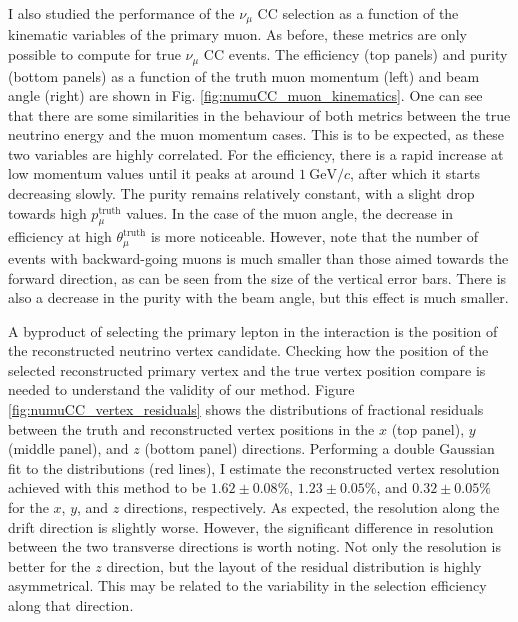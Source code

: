I also studied the performance of the $\nu_{\mu}$ CC selection as a function of the kinematic variables of the primary muon. As before, these metrics are only possible to compute for true $\nu_{\mu}$ CC events. The efficiency (top panels) and purity (bottom panels) as a function of the truth muon momentum (left) and beam angle (right) are shown in Fig. \ref{fig:numuCC_muon_kinematics}. One can see that there are some similarities in the behaviour of both metrics between the true neutrino energy and the muon momentum cases. This is to be expected, as these two variables are highly correlated. For the efficiency, there is a rapid increase at low momentum values until it peaks at around $1~\mathrm{GeV}/c$, after which it starts decreasing slowly. The purity remains relatively constant, with a slight drop towards high $p_{\mu}^{\mathrm{truth}}$ values. In the case of the muon angle, the decrease in efficiency at high $\theta_{\mu}^{\mathrm{truth}}$ is more noticeable. However, note that the number of events with backward-going muons is much smaller than those aimed towards the forward direction, as can be seen from the size of the vertical error bars. There is also a decrease in the purity with the beam angle, but this effect is much smaller.

A byproduct of selecting the primary lepton in the interaction is the position of the reconstructed neutrino vertex candidate. Checking how the position of the selected reconstructed primary vertex and the true vertex position compare is needed to understand the validity of our method. Figure \ref{fig:numuCC_vertex_residuals} shows the distributions of fractional residuals between the truth and reconstructed vertex positions in the $x$ (top panel), $y$ (middle panel), and $z$ (bottom panel) directions. Performing a double Gaussian fit to the distributions (red lines), I estimate the reconstructed vertex resolution achieved with this method to be $1.62 \pm 0.08 \%$, $1.23 \pm 0.05 \%$, and $0.32 \pm 0.05 \%$ for the $x$, $y$, and $z$ directions, respectively. As expected, the resolution along the drift direction is slightly worse. However, the significant difference in resolution between the two transverse directions is worth noting. Not only the resolution is better for the $z$ direction, but the layout of the residual distribution is highly asymmetrical. This may be related to the variability in the selection efficiency along that direction.


